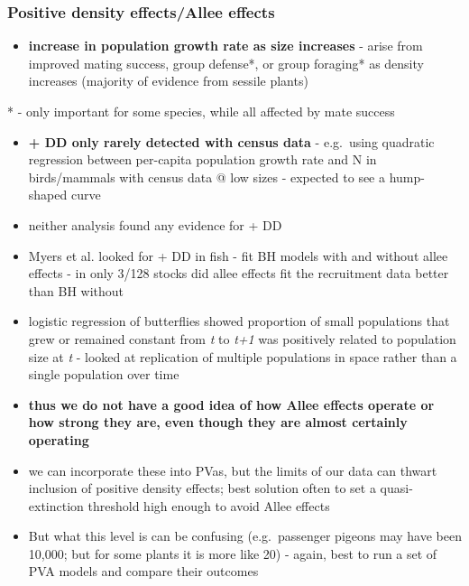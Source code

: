 \documentclass[]{article}
\providecommand{\tightlist}{%
  \setlength{\itemsep}{0pt}\setlength{\parskip}{0pt}}
\begin{document}
\subsubsection{Positive density effects/Allee
effects}\label{positive-density-effectsallee-effects}

\begin{itemize}
\tightlist
\item
  \textbf{increase in population growth rate as size increases} - arise
  from improved mating success, group defense*, or group foraging* as
  density increases (majority of evidence from sessile plants)
\end{itemize}

* - only important for some species, while all affected by mate success

\begin{itemize}
\tightlist
\item
  \textbf{+ DD only rarely detected with census data} - e.g.~using
  quadratic regression between per-capita population growth rate and N
  in birds/mammals with census data @ low sizes - expected to see a
  hump-shaped curve
\item
  neither analysis found any evidence for + DD
\item
  Myers et al. looked for + DD in fish - fit BH models with and without
  allee effects - in only 3/128 stocks did allee effects fit the
  recruitment data better than BH without
\item
  logistic regression of butterflies showed proportion of small
  populations that grew or remained constant from \emph{t} to \emph{t+1}
  was positively related to population size at \emph{t} - looked at
  replication of multiple populations in space rather than a single
  population over time
\item
  \textbf{thus we do not have a good idea of how Allee effects operate
  or how strong they are, even though they are almost certainly
  operating}
\item
  we can incorporate these into PVas, but the limits of our data can
  thwart inclusion of positive density effects; best solution often to
  set a quasi-extinction threshold high enough to avoid Allee effects
\item
  But what this level is can be confusing (e.g.~passenger pigeons may
  have been 10,000; but for some plants it is more like 20) - again,
  best to run a set of PVA models and compare their outcomes
\end{itemize}
\end{document}
